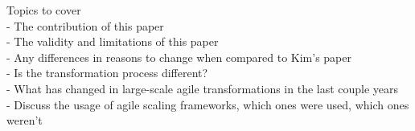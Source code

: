 Topics to cover \\
	- The contribution of this paper \\
	- The validity and limitations of this paper \\
	- Any differences in reasons to change when compared to Kim's paper \\
	- Is the transformation process different? \\
	- What has changed in large-scale agile transformations in the last couple
	years  \\
	- Discuss the usage of agile scaling frameworks, which ones were used, which
	ones weren't \\
